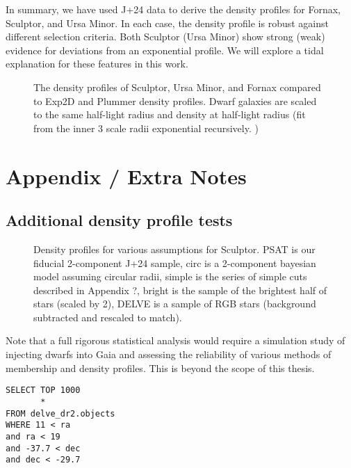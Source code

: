 In summary, we have used J+24 data to derive the density profiles for
Fornax, Sculptor, and Ursa Minor. In each case, the density profile is
robust against different selection criteria. Both Sculptor (Ursa Minor)
show strong (weak) evidence for deviations from an exponential profile.
We will explore a tidal explanation for these features in this work.

\begin{figure}
\centering
{}
\caption[Classical dwarf density profiles]{The density profiles of
Sculptor, Ursa Minor, and Fornax compared to Exp2D and Plummer density
profiles. Dwarf galaxies are scaled to the same half-light radius and
density at half-light radius (fit from the inner 3 scale radii
exponential recursively. )}\label{fig:classical_dwarfs_densities}
\end{figure}

\section{Appendix / Extra Notes}\label{appendix-extra-notes}

\subsection{Additional density profile
tests}\label{additional-density-profile-tests}

\begin{figure}
\centering
{}
\caption[Density profiles]{Density profiles for various assumptions for
Sculptor. PSAT is our fiducial 2-component J+24 sample, circ is a
2-component bayesian model assuming circular radii, simple is the series
of simple cuts described in Appendix ?, bright is the sample of the
brightest half of stars (scaled by 2), DELVE is a sample of RGB stars
(background subtracted and rescaled to
match).}\label{fig:sculptor_observed_profiles}
\end{figure}

Note that a full rigorous statistical analysis would require a
simulation study of injecting dwarfs into Gaia and assessing the
reliability of various methods of membership and density profiles. This
is beyond the scope of this thesis.

\begin{verbatim}
SELECT TOP 1000
       *
FROM delve_dr2.objects
WHERE 11 < ra
and ra < 19
and -37.7 < dec
and dec < -29.7
\end{verbatim}

